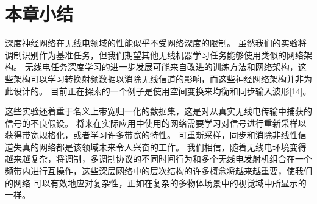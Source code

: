\section{本章小结}
深度神经网络在无线电领域的性能似乎不受网络深度的限制。 虽然我们的实验将调制识别作为基准任务，但我们期望其他无线机器学习任务能够使用类似的网络架构。 无线电任务深度学习的进一步发展可能来自改进的训练方法和网络架构，这些架构可以学习转换射频数据以消除无线信道的影响，而这些神经网络架构并非为此设计的。 目前正在探索的一个例子是使用空间变换来均衡和同步输入波形[14]。\par

这些实验还着重于名义上带宽归一化的数据集，这是对从真实无线电传输中捕获的信号的不良假设。 将来在实际应用中使用的网络需要学习对信号进行重新采样以获得带宽规格化，或者学习许多带宽的特性。 可重新采样，同步和消除非线性信道失真的网络都是该领域未来令人兴奋的工作。 我们相信，随着无线电环境变得越来越复杂，将调制，多调制协议的不同时间行为和多个无线电发射机组合在一个频带内进行互操作，这些深层网络中的层次结构的许多概念将越来越重要，使我们的网络 可以有效地应对复杂性，正如在复杂的多物体场景中的视觉域中所显示的一样。\par